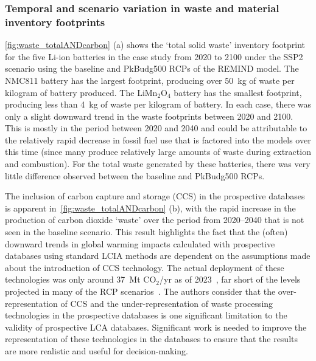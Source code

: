 \documentclass[a4paper,fleqn]{cas-dc}
\begin{document}
\subsubsection{Temporal and scenario variation in waste and material inventory footprints}

\autoref{fig:waste_totalANDcarbon} (a) shows the `total solid waste' inventory footprint for the five Li-ion batteries in the case study from 2020 to 2100 under the SSP2 scenario using the baseline and PkBudg500 RCPs of the REMIND model. The NMC811 battery has the largest footprint, producing over 50~kg of waste per kilogram of battery produced. The  LiMn\(_2\)O\(_4\) battery has the smallest footprint, producing less than 4~kg of waste per kilogram of battery. In each case, there was only a slight downward trend in the waste footprints between 2020 and 2100. This is mostly in the period between 2020 and 2040 and could be attributable to the relatively rapid decrease in fossil fuel use that is factored into the models over this time (since many produce relatively large amounts of waste during extraction and combustion). For the total waste generated by these batteries, there was very little difference observed between the baseline and PkBudg500 RCPs.

The inclusion of carbon capture and storage (CCS) in the prospective databases
is apparent in~\autoref{fig:waste_totalANDcarbon} (b), with the rapid increase
in the production of carbon dioxide `waste' over the period from 2020--2040
that is not seen in the baseline scenario. This result highlights the fact that
the (often) downward trends in global warming impacts calculated with
prospective databases using standard LCIA methods are dependent on the
assumptions made about the introduction of CCS technology. The actual
deployment of these technologies was only around 37~Mt CO$_2$/yr as of
2023~\citep{dziejarski2023ccs}, far short of the levels projected in many of
the RCP scenarios~\citep{sacchi2023premisedocs}. The authors consider that the
over-representation of CCS and the under-representation of waste processing
technologies in the prospective databases is one significant limitation to the
validity of prospective LCA databases. Significant work is needed to improve
the representation of these technologies in the databases to ensure that the
results are more realistic and useful for decision-making.
\end{document}
